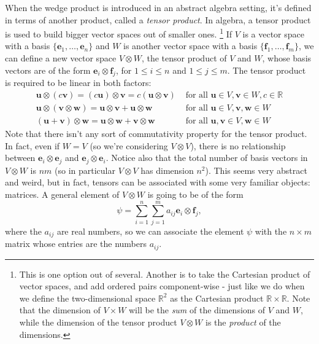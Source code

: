 \documentclass[letterpaper,12pt]{article}
\newcommand{\uu}{\mathbf{u}}
\newcommand{\vv}{\mathbf{v}}
\newcommand{\R}{\mathbb{R}}
\newcommand{\e}{\mathbf{e}}
\begin{document}
When the wedge product is introduced in an abstract algebra setting, it's defined in terms of another product, called a {\em tensor product}. In algebra, a tensor product is used to build bigger vector spaces out of smaller ones. \footnote{This is one option out of several. Another is to take the Cartesian product of vector spaces, and add ordered pairs component-wise - just like we do when we define the two-dimensional space $\R^2$ as the Cartesian product $\R\times\R$. Note that the dimension of $V\times W$ will be the {\em sum} of the dimensions of $V$ and $W$, while the dimension of the tensor product $V\otimes W$ is the {\em product} of the dimensions.}
If $V$ is a vector space with a basis $\{\e_1,\ldots,\e_n\}$ and $W$ is another vector space with a basis $\{\mathbf{f}_1,\ldots, \mathbf{f}_m\}$, we can define a new vector space $V\otimes W$, the tensor product of $V$ and $W$, whose basis vectors are of the form $\e_i\otimes\mathbf{f}_j$, for $1\leq i\leq n$ and $1\leq j\leq m$. The tensor product is required to be linear in both factors:
\begin{align*}
\uu\otimes(c\vv) = (c\uu)\otimes\vv = c(\uu\otimes\vv) &\text{ for all } \uu\in V, \vv\in W, c\in \R\\
\uu\otimes(\vv\otimes\mathbf{w}) = \uu\otimes\vv+\uu\otimes\mathbf{w} &\text{ for all } \uu\in V, \vv,\mathbf{w}\in W\\
(\uu+\vv)\otimes\mathbf{w} = \uu\otimes\mathbf{w}+\vv\otimes\mathbf{w} &\text{ for all } \uu,\vv\in V, \mathbf{w}\in W
\end{align*}
Note that there isn't any sort of commutativity property for the tensor product. In fact, even if $W=V$ (so we're considering $V\otimes V$), there is no relationship between $\e_i\otimes\e_j$ and $\e_j\otimes\e_i$. Notice also that the total number of basis vectors in $V\otimes W$ is $nm$ (so in particular $V\otimes V$ has dimension $n^2$). This seems very abstract and weird, but in fact, tensors can be associated with some very familiar objects: matrices. A general element of $V\otimes W$ is going to be of the form
\[
\psi = \sum_{i=1}^n\sum_{j=1}^m a_{ij}\e_i\otimes \mathbf{f}_j,
\]
where the $a_{ij}$ are real numbers, so we can associate the element $\psi$ with the $n\times m$ matrix whose entries are the numbers $a_{ij}$.
\end{document}
